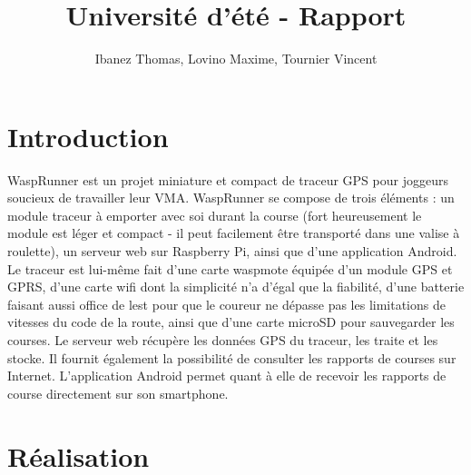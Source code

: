 \documentclass[a4paper,11pt]{article}
\title{Université d'été - Rapport}
\author{Ibanez Thomas, Lovino Maxime, Tournier Vincent}
\begin{document}
\maketitle
\section{Introduction}
WaspRunner est un projet miniature et compact de traceur GPS pour joggeurs soucieux de travailler leur VMA.\newline
WaspRunner se compose de trois éléments : un module traceur à emporter avec soi durant la course (fort heureusement le module est léger et compact - il peut facilement être transporté dans une valise à roulette), un serveur web sur Raspberry Pi, ainsi que d'une application Android.\newline
Le traceur est lui-même fait d'une carte waspmote équipée d'un module GPS et GPRS, d'une carte wifi dont la simplicité n'a d'égal que la fiabilité, d'une batterie faisant aussi office de lest pour que le coureur ne dépasse pas les limitations de vitesses du code de la route, ainsi que d'une carte microSD pour sauvegarder les courses.\newline
Le serveur web récupère les données GPS du traceur, les traite et les stocke. Il fournit également la possibilité de consulter les rapports de courses sur Internet.\newline
L'application Android permet quant à elle de recevoir les rapports de course directement sur son smartphone.\newline
\section{Réalisation}
\end{document}
